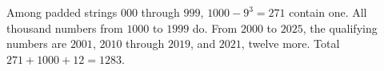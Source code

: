 Among padded strings $000$ through $999$, $1000-9^3=271$ contain one. All thousand numbers from $1000$ to $1999$ do. From $2000$ to $2025$, the qualifying numbers are $2001$, $2010$ through $2019$, and $2021$, twelve more. Total $271+1000+12=\boxed{1283}$.
